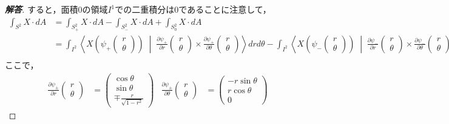 \documentclass[dvipdfmx,uplatex,nosetpagesize]{jsarticle}
\theoremstyle{definition}
\theoremstyle{StatementsWithStar}
\theoremstyle{StatementsWithStar2}
\theoremstyle{StatementsWithStar3}
\theoremstyle{StatementsWithCCirc}
\theoremstyle{definition}
\begin{document}
\begin{proof}[\bf{解答}]
すると，面積$0$の領域$I^1$での二重積分は$0$であることに注意して，
\begin{align*}
    \int_{S^2}X\cdot dA &= \int_{S^2_+}X\cdot dA - \int_{S^2_-}X\cdot dA + \int_{S^2_0}X\cdot dA \\
    &= \int_{I^2} \left\langle X\left(\psi_+\begin{pmatrix}r\\\theta\end{pmatrix}\right)\;\middle|\; \frac{\partial \psi_+}{\partial r}\begin{pmatrix}r\\\theta\end{pmatrix}\times\frac{\partial \psi_+}{\partial \theta}\begin{pmatrix}r\\\theta\end{pmatrix} \right\rangle drd\theta
    - \int_{I^2} \left\langle X\left(\psi_-\begin{pmatrix}r\\\theta\end{pmatrix}\right)\;\middle|\; \frac{\partial \psi_-}{\partial r}\begin{pmatrix}r\\\theta\end{pmatrix}\times\frac{\partial \psi_-}{\partial \theta}\begin{pmatrix}r\\\theta\end{pmatrix} \right\rangle drd\theta\\
\end{align*}
ここで，
\begin{align*}
    \frac{\partial \psi_\pm}{\partial r}\begin{pmatrix}r\\\theta\end{pmatrix} &= \begin{pmatrix}\cos\theta\\\sin\theta\\\mp\frac{r}{\sqrt{1-r^2}}\end{pmatrix} &
    \frac{\partial \psi_\pm}{\partial \theta}\begin{pmatrix}r\\\theta\end{pmatrix} &= \begin{pmatrix}-r\sin\theta\\r\cos\theta\\0\end{pmatrix}
\end{align*}

\end{proof}
\end{document}
